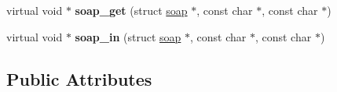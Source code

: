 \begin{DoxyCompactItemize}
\item 
\hypertarget{classns3____DataHolder_a3b0004279edad9d3b9c4e305542ed72f}{
virtual void $\ast$ {\bfseries soap\_\-get} (struct \hyperlink{classns3____DataHolder_a601e3e4e48a7d8eb9f2e29a68a333563}{soap} $\ast$, const char $\ast$, const char $\ast$)}
\label{classns3____DataHolder_a3b0004279edad9d3b9c4e305542ed72f}

\item 
\hypertarget{classns3____DataHolder_ac056e1a4ce0f12a37542ef3ccb98ebeb}{
virtual void $\ast$ {\bfseries soap\_\-in} (struct \hyperlink{classns3____DataHolder_a601e3e4e48a7d8eb9f2e29a68a333563}{soap} $\ast$, const char $\ast$, const char $\ast$)}
\label{classns3____DataHolder_ac056e1a4ce0f12a37542ef3ccb98ebeb}

\end{DoxyCompactItemize}
\subsection*{Public Attributes}

